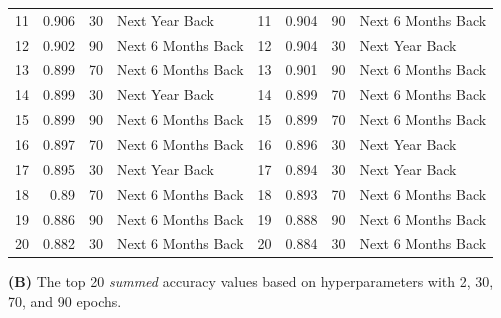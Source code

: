 \documentclass[utf8]{FrontiersinVancouver} %
\begin{document}
\begin{table}
\begin{center}
{\begin{tabular}{|r|r|r|l| |r|r|r|l|}
11  &  0.906 &     30 &      Next Year Back &  11 & 0.904 &     90 &  Next 6 Months Back \\
12  &  0.902 &     90 &  Next 6 Months Back &  12 & 0.904 &     30 &      Next Year Back \\
13  &  0.899 &     70 &  Next 6 Months Back &  13 & 0.901 &     90 &  Next 6 Months Back \\
14  &  0.899 &     30 &      Next Year Back &  14 & 0.899 &     70 &  Next 6 Months Back \\
15  &  0.899 &     90 &  Next 6 Months Back &  15 & 0.899 &     70 &  Next 6 Months Back \\
16  &  0.897 &     70 &  Next 6 Months Back &  16 & 0.896 &     30 &      Next Year Back \\
17  &  0.895 &     30 &      Next Year Back &  17 & 0.894 &     30 &      Next Year Back \\
18  &  0.89 &     70 &  Next 6 Months Back &  18 & 0.893 &     70 &  Next 6 Months Back \\
19  &  0.886 &     90 &  Next 6 Months Back &  19 & 0.888 &     90 &  Next 6 Months Back \\
20  &  0.882 &     30 &  Next 6 Months Back &  20 & 0.884 &     30 &  Next 6 Months Back \\

        \hline
        \end{tabular}
        }
        \end{center}
        
        {\bf (B)} The top 20 {\em summed} accuracy values based on hyperparameters with 2, 30, 70, and 90 epochs.


\end{table}
\end{document}
